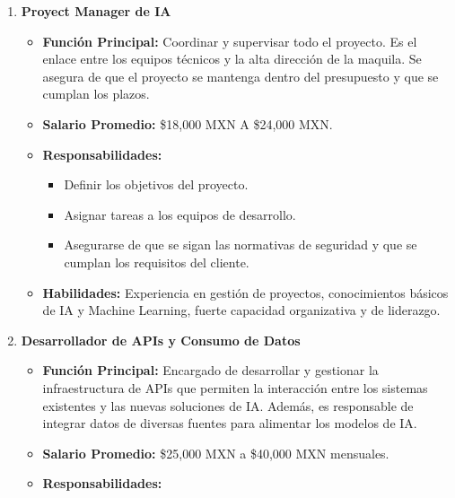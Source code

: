 \documentclass[
  10pt,
  letterpaper,
]{book}
\providecommand{\tightlist}{%
  \setlength{\itemsep}{0pt}\setlength{\parskip}{0pt}}\usepackage{longtable,booktabs,array}
\begin{document}
\begin{enumerate}
\def\labelenumi{\arabic{enumi}.}
\tightlist
\item
  \textbf{Proyect Manager de IA}

  \begin{itemize}
  \tightlist
  \item
    \textbf{Función Principal:} Coordinar y supervisar todo el proyecto.
    Es el enlace entre los equipos técnicos y la alta dirección de la
    maquila. Se asegura de que el proyecto se mantenga dentro del
    presupuesto y que se cumplan los plazos.
  \item
    \textbf{Salario Promedio:} \$18,000 MXN A \$24,000 MXN.
  \item
    \textbf{Responsabilidades:}

    \begin{itemize}
    \tightlist
    \item
      Definir los objetivos del proyecto.
    \item
      Asignar tareas a los equipos de desarrollo.
    \item
      Asegurarse de que se sigan las normativas de seguridad y que se
      cumplan los requisitos del cliente.
    \end{itemize}
  \item
    \textbf{Habilidades:} Experiencia en gestión de proyectos,
    conocimientos básicos de IA y Machine Learning, fuerte capacidad
    organizativa y de liderazgo.
  \end{itemize}
\item
  \textbf{Desarrollador de APIs y Consumo de Datos}

  \begin{itemize}
  \tightlist
  \item
    \textbf{Función Principal:} Encargado de desarrollar y gestionar la
    infraestructura de APIs que permiten la interacción entre los
    sistemas existentes y las nuevas soluciones de IA. Además, es
    responsable de integrar datos de diversas fuentes para alimentar los
    modelos de IA.
  \item
    \textbf{Salario Promedio:} \$25,000 MXN a \$40,000 MXN mensuales.
  \item
    \textbf{Responsabilidades:}


\end{itemize}
\end{enumerate}
\end{document}
